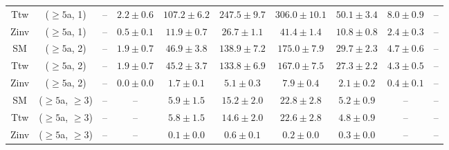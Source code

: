\begin{table}[h!]
{\begin{tabular}{cccccccccc}
	Ttw & ($\ge5$a, 1) & -- & $2.2\pm 0.6$ & $107.2\pm 6.2$ & $247.5\pm 9.7$ & $306.0\pm 10.1$ & $50.1\pm 3.4$ & $8.0\pm 0.9$ & -- \\[0.5ex] 
	Zinv & ($\ge5$a, 1) & -- & $0.5\pm 0.1$ & $11.9\pm 0.7$ & $26.7\pm 1.1$ & $41.4\pm 1.4$ & $10.8\pm 0.8$ & $2.4\pm 0.3$ & -- \\[0.5ex] 
	SM & ($\ge5$a, 2) & -- & $1.9\pm 0.7$ & $46.9\pm 3.8$ & $138.9\pm 7.2$ & $175.0\pm 7.9$ & $29.7\pm 2.3$ & $4.7\pm 0.6$ & -- \\[0.5ex] 
	Ttw & ($\ge5$a, 2) & -- & $1.9\pm 0.7$ & $45.2\pm 3.7$ & $133.8\pm 6.9$ & $167.0\pm 7.5$ & $27.3\pm 2.2$ & $4.3\pm 0.5$ & -- \\[0.5ex] 
	Zinv & ($\ge5$a, 2) & -- & $0.0\pm 0.0$ & $1.7\pm 0.1$ & $5.1\pm 0.3$ & $7.9\pm 0.4$ & $2.1\pm 0.2$ & $0.4\pm 0.1$ & -- \\[0.5ex] 
	SM & ($\ge5$a, $\ge3$) & -- & -- & $5.9\pm 1.5$ & $15.2\pm 2.0$ & $22.8\pm 2.8$ & $5.2\pm 0.9$ & -- & -- \\[0.5ex] 
	Ttw & ($\ge5$a, $\ge3$) & -- & -- & $5.8\pm 1.5$ & $14.6\pm 2.0$ & $22.6\pm 2.8$ & $4.8\pm 0.9$ & -- & -- \\[0.5ex] 
	Zinv & ($\ge5$a, $\ge3$) & -- & -- & $0.1\pm 0.0$ & $0.6\pm 0.1$ & $0.2\pm 0.0$ & $0.3\pm 0.0$ & -- & -- \\[0.5ex] 
	\hline
	\hline
\end{tabular}}
\end{table}
